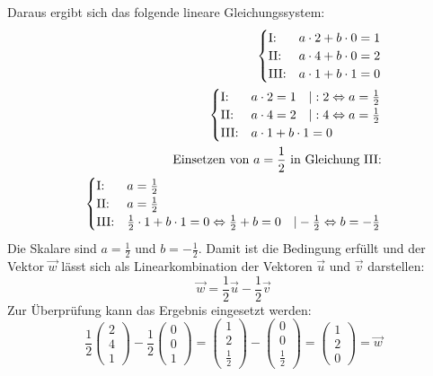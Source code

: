 Daraus ergibt sich das folgende lineare Gleichungssystem:
\begin{align*}
    \begin{cases}
        \text{I:\@}   & a \cdot 2 + b \cdot 0 = 1 \\
        \text{II:\@}  & a \cdot 4 + b \cdot 0 = 2 \\
        \text{III:\@} & a \cdot 1 + b \cdot 1 = 0
    \end{cases}                                 \\
    \begin{cases}
        \text{I:\@}   & a \cdot 2 = 1 \quad | : 2 \Leftrightarrow a = \frac{1}{2} \\
        \text{II:\@}  & a \cdot 4 = 2 \quad | : 4 \Leftrightarrow a = \frac{1}{2} \\
        \text{III:\@} & a \cdot 1 + b \cdot 1 = 0
    \end{cases} \\
    \text{Einsetzen von } a=\frac{1}{2} \text{ in Gleichung III:}             \\
    \begin{cases}
        \text{I:\@}   & a = \frac{1}{2}                                                                                                               \\
        \text{II:\@}  & a = \frac{1}{2}                                                                                                               \\
        \text{III:\@} & \frac{1}{2} \cdot 1 + b \cdot 1 = 0 \Leftrightarrow \frac{1}{2} + b = 0 \quad |- \frac{1}{2} \Leftrightarrow b = -\frac{1}{2}
    \end{cases}
\end{align*}
Die Skalare sind $a = \frac{1}{2}$ und $b = -\frac{1}{2}$. Damit ist die Bedingung erfüllt und der Vektor $\vec{w}$ lässt sich als Linearkombination der Vektoren $\vec{u}$ und $\vec{v}$ darstellen:
$$ \vec{w} = \frac{1}{2} \vec{u} - \frac{1}{2} \vec{v} $$
Zur Überprüfung kann das Ergebnis eingesetzt werden:
$$ \frac{1}{2} \begin{pmatrix} 2 \\ 4 \\ 1 \end{pmatrix} - \frac{1}{2} \begin{pmatrix} 0 \\ 0 \\ 1 \end{pmatrix} = \begin{pmatrix} 1 \\ 2 \\ \frac{1}{2} \end{pmatrix} - \begin{pmatrix} 0 \\ 0 \\ \frac{1}{2} \end{pmatrix} = \begin{pmatrix} 1 \\ 2 \\ 0 \end{pmatrix} = \vec{w} $$